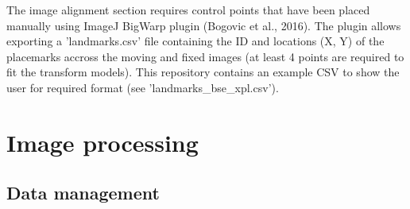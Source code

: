 	The image alignment section requires control points that have been placed manually using ImageJ BigWarp plugin (Bogovic et al., 2016). The plugin allows exporting a 'landmarks.csv' file containing the ID and locations (X, Y) of the placemarks accross the moving and fixed images (at least 4 points are required to fit the transform models). This repository contains an example CSV to show the user for required format (see 'landmarks\_bse\_xpl.csv').
	
	\section{Image processing}
		
	\subsection{Data management}
